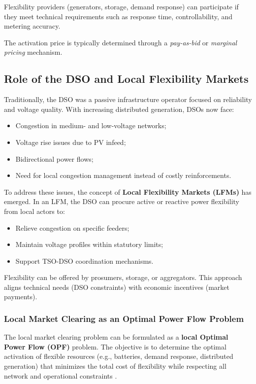 \documentclass[11pt]{article}
\begin{document}
	Flexibility providers (generators, storage, demand response) can participate if they meet technical requirements such as response time, controllability, and metering accuracy.
	
	The activation price is typically determined through a \textit{pay-as-bid} or \textit{marginal pricing} mechanism.
	
	\subsection{Role of the DSO and Local Flexibility Markets}
	
	Traditionally, the DSO was a passive infrastructure operator focused on reliability and voltage quality.  
	With increasing distributed generation, DSOs now face:
	\begin{itemize}
		\item Congestion in medium- and low-voltage networks;
		\item Voltage rise issues due to PV infeed;
		\item Bidirectional power flows;
		\item Need for local congestion management instead of costly reinforcements.
	\end{itemize}
	
	To address these issues, the concept of \textbf{Local Flexibility Markets (LFMs)} has emerged.  
	In an LFM, the DSO can procure active or reactive power flexibility from local actors to:
	\begin{itemize}
		\item Relieve congestion on specific feeders;
		\item Maintain voltage profiles within statutory limits;
		\item Support TSO-DSO coordination mechanisms.
	\end{itemize}
		
	Flexibility can be offered by prosumers, storage, or aggregators.  
	This approach aligns technical needs (DSO constraints) with economic incentives (market payments).
	
	\subsubsection{Local Market Clearing as an Optimal Power Flow Problem}
	
	The local market clearing problem can be formulated as a \textbf{local Optimal Power Flow (OPF)} problem.  
	The objective is to determine the optimal activation of flexible resources (e.g., batteries, demand response, distributed generation) that minimizes the total cost of flexibility while respecting all network and operational constraints \cite{molzahn2019opf,caramanis2016flexibility}.
	
\end{document}
